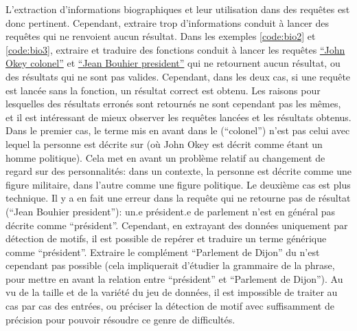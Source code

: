 L'extraction d'informations biographiques et leur utilisation dans des requêtes est donc pertinent. Cependant, extraire trop d'informations conduit à lancer des requêtes qui ne renvoient aucun résultat. Dans les exemples \ref{code:bio2} et \ref{code:bio3}, extraire et traduire des fonctions conduit à lancer les requêtes \href{https://www.wikidata.org/w/index.php?search=John+Okey+colonel&title=Special:Search&profile=advanced&fulltext=1&ns0=1&ns120=1}{\enquote{John Okey colonel}} et \href{https://www.wikidata.org/w/index.php?search=Jean+Bouhier+president&title=Special:Search&profile=advanced&fulltext=1&ns0=1&ns120=1}{\enquote{Jean Bouhier president}} qui ne retournent aucun résultat, ou des résultats qui ne sont pas valides. Cependant, dans les deux cas, si une requête est lancée sans la fonction, un résultat correct est obtenu. Les raisons pour lesquelles des résultats erronés sont retournés ne sont cependant pas les mêmes, et il est intéressant de mieux observer les requêtes lancées et les résultats obtenus. Dans le premier cas, le terme mis en avant dans le \ttrait{} (\enquote{colonel}) n'est pas celui avec lequel la personne est décrite sur \wkd{} (où John Okey est décrit comme étant un homme politique). Cela met en avant un problème relatif au changement de regard sur des personnalités: dans un contexte, la personne est décrite comme une figure militaire, dans l'autre comme une figure politique. Le deuxième cas est plus technique. Il y a en fait une erreur dans la requête qui ne retourne pas de résultat (\enquote{Jean Bouhier president}): un.e président.e de parlement n'est en général pas décrite comme \enquote{président}. Cependant, en extrayant des données uniquement par détection de motifs, il est possible de repérer et traduire un terme générique comme \enquote{président}. Extraire le complément \enquote{Parlement de Dijon} du \ttrait{} n'est cependant pas possible (cela impliquerait d'étudier la grammaire de la phrase, pour mettre en avant la relation entre \enquote{président} et \enquote{Parlement de Dijon}). Au vu de la taille et de la variété du jeu de données, il est impossible de traiter au cas par cas des entrées, ou préciser la détection de motif avec suffisamment de précision pour pouvoir résoudre ce genre de difficultés. 

